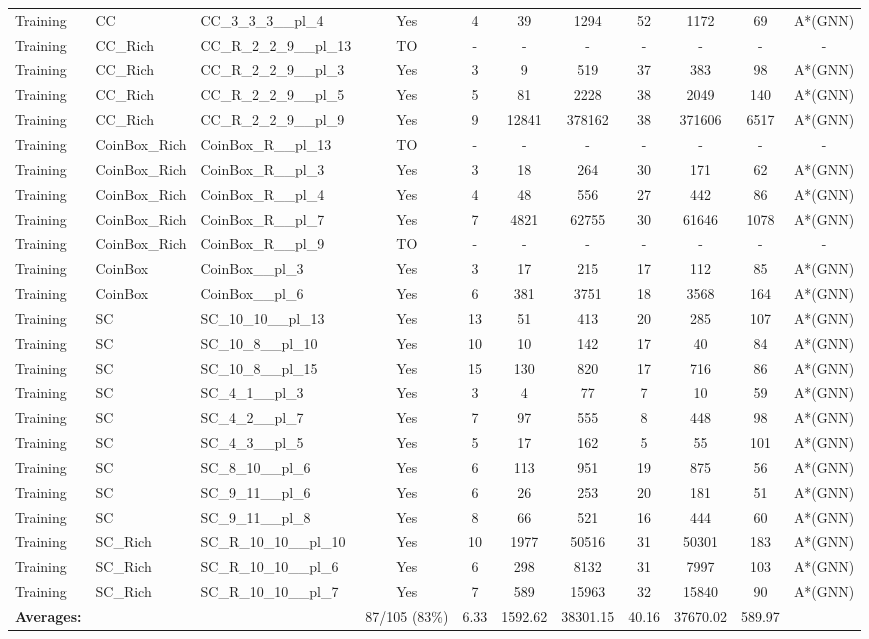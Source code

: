 \documentclass{article}
\begin{document}
\begin{tabular}{lllcccccccc}
Training & CC & CC\_3\_3\_3\_\_pl\_4 & Yes & 4 & 39 & 1294 & 52 & 1172 & 69 & A*(GNN) \\
Training & CC\_Rich & CC\_R\_2\_2\_9\_\_pl\_13 & TO & - & - & - & - & - & - & - \\
Training & CC\_Rich & CC\_R\_2\_2\_9\_\_pl\_3 & Yes & 3 & 9 & 519 & 37 & 383 & 98 & A*(GNN) \\
Training & CC\_Rich & CC\_R\_2\_2\_9\_\_pl\_5 & Yes & 5 & 81 & 2228 & 38 & 2049 & 140 & A*(GNN) \\
Training & CC\_Rich & CC\_R\_2\_2\_9\_\_pl\_9 & Yes & 9 & 12841 & 378162 & 38 & 371606 & 6517 & A*(GNN) \\
Training & CoinBox\_Rich & CoinBox\_R\_\_pl\_13 & TO & - & - & - & - & - & - & - \\
Training & CoinBox\_Rich & CoinBox\_R\_\_pl\_3 & Yes & 3 & 18 & 264 & 30 & 171 & 62 & A*(GNN) \\
Training & CoinBox\_Rich & CoinBox\_R\_\_pl\_4 & Yes & 4 & 48 & 556 & 27 & 442 & 86 & A*(GNN) \\
Training & CoinBox\_Rich & CoinBox\_R\_\_pl\_7 & Yes & 7 & 4821 & 62755 & 30 & 61646 & 1078 & A*(GNN) \\
Training & CoinBox\_Rich & CoinBox\_R\_\_pl\_9 & TO & - & - & - & - & - & - & - \\
Training & CoinBox & CoinBox\_\_pl\_3 & Yes & 3 & 17 & 215 & 17 & 112 & 85 & A*(GNN) \\
Training & CoinBox & CoinBox\_\_pl\_6 & Yes & 6 & 381 & 3751 & 18 & 3568 & 164 & A*(GNN) \\
Training & SC & SC\_10\_10\_\_pl\_13 & Yes & 13 & 51 & 413 & 20 & 285 & 107 & A*(GNN) \\
Training & SC & SC\_10\_8\_\_pl\_10 & Yes & 10 & 10 & 142 & 17 & 40 & 84 & A*(GNN) \\
Training & SC & SC\_10\_8\_\_pl\_15 & Yes & 15 & 130 & 820 & 17 & 716 & 86 & A*(GNN) \\
Training & SC & SC\_4\_1\_\_pl\_3 & Yes & 3 & 4 & 77 & 7 & 10 & 59 & A*(GNN) \\
Training & SC & SC\_4\_2\_\_pl\_7 & Yes & 7 & 97 & 555 & 8 & 448 & 98 & A*(GNN) \\
Training & SC & SC\_4\_3\_\_pl\_5 & Yes & 5 & 17 & 162 & 5 & 55 & 101 & A*(GNN) \\
Training & SC & SC\_8\_10\_\_pl\_6 & Yes & 6 & 113 & 951 & 19 & 875 & 56 & A*(GNN) \\
Training & SC & SC\_9\_11\_\_pl\_6 & Yes & 6 & 26 & 253 & 20 & 181 & 51 & A*(GNN) \\
Training & SC & SC\_9\_11\_\_pl\_8 & Yes & 8 & 66 & 521 & 16 & 444 & 60 & A*(GNN) \\
Training & SC\_Rich & SC\_R\_10\_10\_\_pl\_10 & Yes & 10 & 1977 & 50516 & 31 & 50301 & 183 & A*(GNN) \\
Training & SC\_Rich & SC\_R\_10\_10\_\_pl\_6 & Yes & 6 & 298 & 8132 & 31 & 7997 & 103 & A*(GNN) \\
Training & SC\_Rich & SC\_R\_10\_10\_\_pl\_7 & Yes & 7 & 589 & 15963 & 32 & 15840 & 90 & A*(GNN) \\
\textbf{Averages:} & & & 87/105 (83\%) & 6.33 & 1592.62 & 38301.15 & 40.16 & 37670.02 & 589.97 & \\
\bottomrule
\end{tabular}
\newpage
\end{document}
